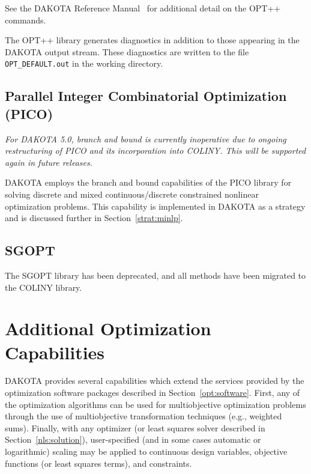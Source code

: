 See the DAKOTA Reference Manual~\cite{RefMan} for additional detail on the
OPT++ commands.

The OPT++ library generates diagnostics in addition to those appearing
in the DAKOTA output stream. These diagnostics are written to the file
\texttt{OPT\_DEFAULT.out} in the working directory.

\subsection{Parallel Integer Combinatorial Optimization (PICO)}\label{opt:software:pico}

\emph{For DAKOTA 5.0, branch and bound is currently inoperative due to 
ongoing restructuring of PICO and its incorporation into COLINY.
This will be supported again in future releases.}

DAKOTA employs the branch and bound capabilities of the PICO library
for solving discrete and mixed continuous/discrete constrained
nonlinear optimization problems. This capability is implemented in
DAKOTA as a strategy and is discussed further in
Section~\ref{strat:minlp}.

\subsection{SGOPT}\label{opt:software:sgopt}

The SGOPT library has been deprecated, and all methods have been
migrated to the COLINY library.

\section{Additional Optimization Capabilities}\label{opt:additional}

DAKOTA provides several capabilities which extend the services
provided by the optimization software packages described in
Section~\ref{opt:software}. First, any of the optimization algorithms
can be used for multiobjective optimization problems through the use
of multiobjective transformation techniques (e.g., weighted sums). 
Finally, with any optimizer (or least squares solver described in
Section~\ref{nls:solution}), user-specified (and in some cases
automatic or logarithmic) scaling may be applied to continuous design
variables, objective functions (or least squares terms), and constraints.

